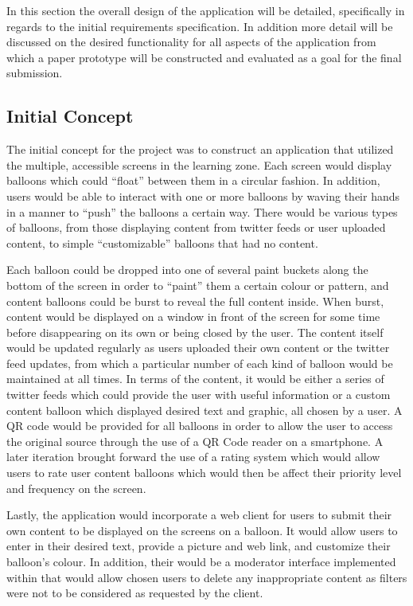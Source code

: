 In this section the overall design of the application will be detailed, specifically in regards to the initial requirements specification. In addition more detail will be discussed on the desired functionality for all aspects of the application from which a paper prototype will be constructed and evaluated as a goal for the final submission.

\subsection{Initial Concept}
The initial concept for the project was to construct an application that utilized the multiple, accessible screens in the learning zone. Each screen would display balloons which could ``float'' between them in a circular fashion. In addition, users would be able to interact with one or more balloons by waving their hands in a manner to ``push'' the balloons a certain way. There would be various types of balloons, from those displaying content from twitter feeds or user uploaded content, to simple ``customizable'' balloons that had no content.

Each balloon could be dropped into one of several paint buckets along the bottom of the screen in order to ``paint'' them a certain colour or pattern, and content balloons could be burst to reveal the full content inside. When burst, content would be displayed on a window in front of the screen for some time before disappearing on its own or being closed by the user. The content itself would be updated regularly as users uploaded their own content or the twitter feed updates, from which a particular number of each kind of balloon would be maintained at all times. In terms of the content, it would be either a series of twitter feeds which could provide the user with useful information or a custom content balloon which displayed desired text and graphic, all chosen by a user. A QR code would be provided for all balloons in order to allow the user to access the original source through the use of a QR Code reader on a smartphone. A later iteration brought forward the use of a rating system which would allow users to rate user content balloons which would then be affect their priority level and frequency on the screen.

Lastly, the application would incorporate a web client for users to submit their own content to be displayed on the screens on a balloon. It would allow users to enter in their desired text, provide a picture and web link, and customize their balloon's colour. In addition, their would be a moderator interface implemented within that would allow chosen users to delete any inappropriate content as filters were not to be considered as requested by the client.

